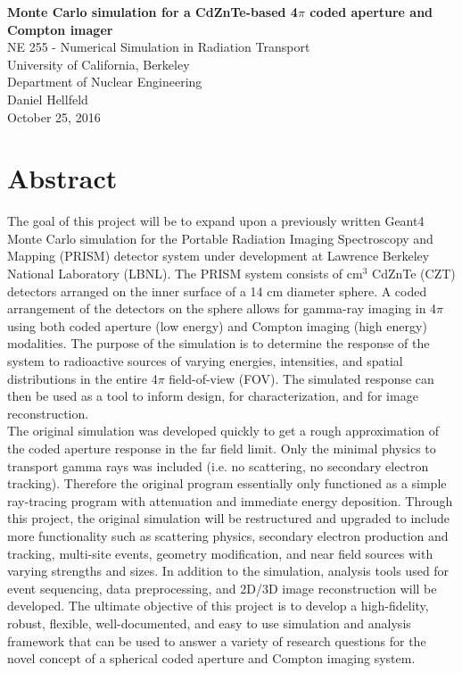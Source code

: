 \documentclass[10pt]{article}
\begin{document}
\begin{centering}
\textbf{Monte Carlo simulation for a CdZnTe-based 4$\pi$ coded aperture and Compton imager}\\
\vspace{10pt}
NE 255 - Numerical Simulation in Radiation Transport\\
University of California, Berkeley\\
Department of Nuclear Engineering\\
\vspace{10pt}
Daniel Hellfeld\\
\vspace{10pt}
October 25, 2016 \\
\end{centering}


\section*{Abstract}

The goal of this project will be to expand upon a previously written Geant4 Monte Carlo simulation for the Portable Radiation Imaging Spectroscopy and Mapping (PRISM) detector system under development at Lawrence Berkeley National Laboratory (LBNL). The PRISM system consists of cm$^3$ CdZnTe (CZT) detectors arranged on the inner surface of a 14 cm diameter sphere. A coded arrangement of the detectors on the sphere allows for gamma-ray imaging in 4$\pi$ using both coded aperture (low energy) and Compton imaging (high energy) modalities. The purpose of the simulation is to determine the response of the system to radioactive sources of varying energies, intensities, and spatial distributions in the entire 4$\pi$ field-of-view (FOV). The simulated response can then be used as a tool to inform design, for characterization, and for image reconstruction. \\

The original simulation was developed quickly to get a rough approximation of the coded aperture response in the far field limit. Only the minimal physics to transport gamma rays was included (i.e. no scattering, no secondary electron tracking). Therefore the original program essentially only functioned as a simple ray-tracing program with attenuation and immediate energy deposition. Through this project, the original simulation will be restructured and upgraded to include more functionality such as scattering physics, secondary electron production and tracking, multi-site events, geometry modification, and near field sources with varying strengths and sizes. In addition to the simulation, analysis tools used for event sequencing, data preprocessing, and 2D/3D image reconstruction will be developed. The ultimate objective of this project is to develop a high-fidelity, robust, flexible, well-documented, and easy to use simulation and analysis framework that can be used to answer a variety of research questions for the novel concept of a spherical coded aperture and Compton imaging system. \\
\end{document}
